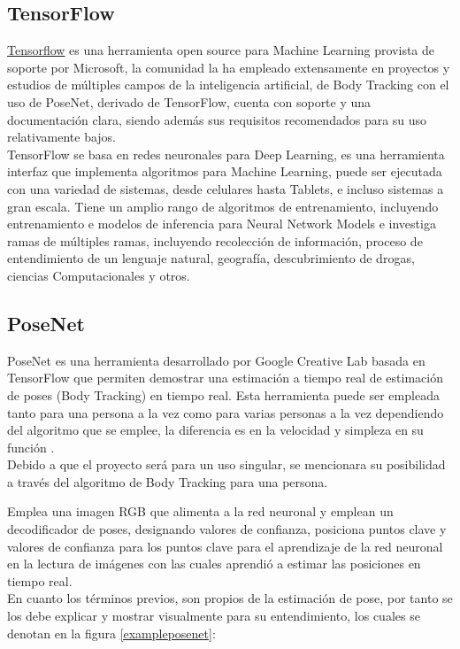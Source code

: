 \subsection{TensorFlow}

\href{https://www.tensorflow.org/lite/models/pose_estimation/overview}{Tensorflow}
es una herramienta open source para Machine Learning provista de soporte por Microsoft, la comunidad la ha empleado extensamente en proyectos y estudios de múltiples campos de la inteligencia artificial,  de Body Tracking con el uso de PoseNet, derivado de TensorFlow, cuenta con soporte y una documentación clara, siendo además sus requisitos recomendados para su uso relativamente bajos. 
\\
TensorFlow se basa en redes neuronales para Deep Learning, es una herramienta interfaz que implementa algoritmos para Machine Learning, puede ser ejecutada con una variedad de sistemas, desde celulares hasta Tablets, e incluso sistemas a gran escala. Tiene un amplio rango de algoritmos de entrenamiento, incluyendo entrenamiento e modelos de inferencia para Neural Network Models e investiga ramas de múltiples ramas, incluyendo recolección de información, proceso de entendimiento de un lenguaje natural, geografía, descubrimiento de drogas, ciencias Computacionales y otros.  \cite{abadi2016tensorflow}

\subsection{PoseNet}

PoseNet es una herramienta desarrollado por Google Creative Lab basada en TensorFlow que permiten demostrar una estimación a tiempo real de estimación de poses (Body Tracking) en tiempo real. Esta herramienta puede ser empleada tanto para una persona a la vez como para varias personas a la vez dependiendo del algoritmo que se emplee, la diferencia es en la velocidad y simpleza en su función \cite{kendall2015posenet}.
\\
Debido a que el proyecto será para un uso singular, se mencionara su posibilidad a través del algoritmo de Body Tracking para una persona.

Emplea una imagen RGB que alimenta a la red neuronal y emplean un decodificador de poses, designando valores de confianza, posiciona puntos clave y valores de confianza para los puntos clave para el aprendizaje de la red neuronal en la lectura de imágenes con las cuales aprendió a estimar las posiciones en tiempo real\cite{oved2018real}.
\\
En cuanto los términos previos, son propios de la estimación de pose, por tanto se los debe explicar y mostrar visualmente para su entendimiento, los cuales se denotan en la figura \ref{exampleposenet}:

